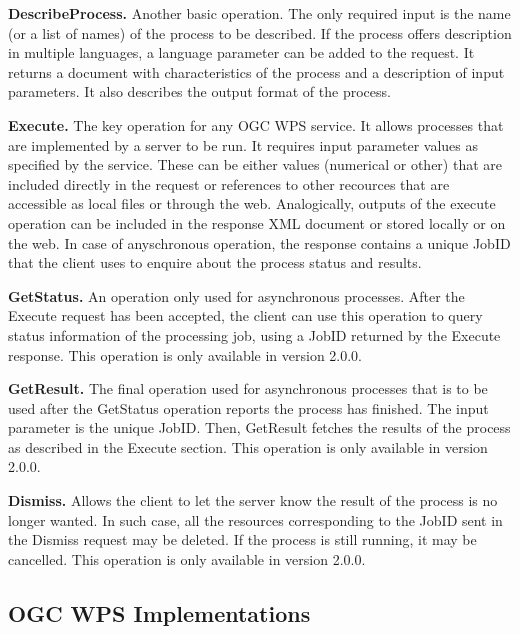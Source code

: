 \noindent \textbf{DescribeProcess.} Another basic operation. The only
required input is the name (or a list of names) of the process to be
described. If the process offers description in multiple languages, a
language parameter can be added to the request. It returns a document
with characteristics of the process and a description of input
parameters. It also describes the output format of the process.

\noindent \textbf{Execute.} The key operation for any OGC WPS
service. It allows processes that are implemented by a server to be
run. It requires input parameter values as specified by the
service. These can be either values (numerical or other) that are
included directly in the request or references to other recources that
are accessible as local files or through the web. Analogically,
outputs of the execute operation can be included in the response XML
document or stored locally or on the web. In case of anyschronous
operation, the response contains a unique JobID that the client uses
to enquire about the process status and results.

\noindent \textbf{GetStatus.} An operation only used for asynchronous
processes. After the Execute request has been accepted, the client can
use this operation to query status information of the processing job,
using a JobID returned by the Execute response. This operation is only
available in version 2.0.0.

\noindent \textbf{GetResult.} The final operation used for
asynchronous processes that is to be used after the GetStatus
operation reports the process has finished. The input parameter is the
unique JobID. Then, GetResult fetches the results of the process as
described in the Execute section. This operation is only available in
version 2.0.0.

\noindent \textbf{Dismiss.} Allows the client to let the server know
the result of the process is no longer wanted. In such case, all the
resources corresponding to the JobID sent in the Dismiss request may
be deleted. If the process is still running, it may be cancelled. This
operation is only available in version 2.0.0.

\subsection{OGC WPS Implementations}


